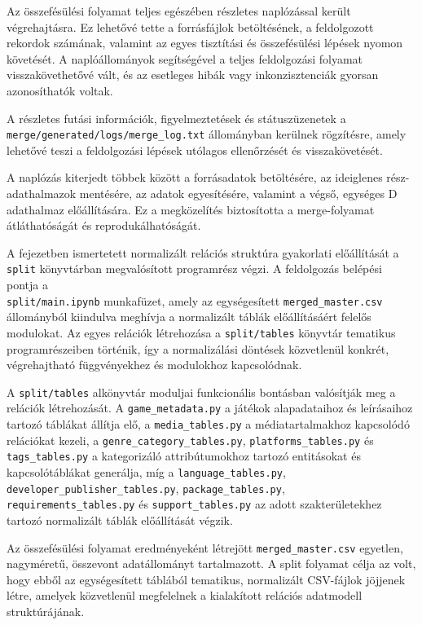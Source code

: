 Az összefésülési folyamat teljes egészében részletes naplózással került végrehajtásra. Ez lehetővé tette a forrásfájlok betöltésének, a feldolgozott rekordok számának, valamint az egyes tisztítási és összefésülési lépések nyomon követését. A naplóállományok segítségével a teljes feldolgozási folyamat visszakövethetővé vált, és az esetleges hibák vagy inkonzisztenciák gyorsan azonosíthatók voltak. 

A részletes futási információk, figyelmeztetések és státuszüzenetek a \\
\texttt{merge/generated/logs/merge\_log.txt} állományban kerülnek
rögzítésre, amely lehetővé teszi a feldolgozási lépések utólagos
ellenőrzését és visszakövetését.

A naplózás kiterjedt többek között a forrásadatok betöltésére, az ideiglenes rész-adathalmazok mentésére, az adatok egyesítésére, valamint a végső, egységes D adathalmaz előállítására. Ez a megközelítés biztosította a merge-folyamat átláthatóságát és reprodukálhatóságát.


A fejezetben ismertetett normalizált relációs struktúra gyakorlati
előállítását a \texttt{split} könyvtárban megvalósított programrész végzi.
A feldolgozás belépési pontja a \\
\texttt{split/main.ipynb} munkafüzet, amely az egységesített \texttt{merged\_master.csv} állományból kiindulva
meghívja a normalizált táblák előállításáért felelős modulokat. Az egyes
relációk létrehozása a \texttt{split/tables} könyvtár tematikus
programrészeiben történik, így a normalizálási döntések közvetlenül
konkrét, végrehajtható függvényekhez és modulokhoz kapcsolódnak.

A \texttt{split/tables} alkönyvtár moduljai funkcionális bontásban
valósítják meg a relációk létrehozását. A \texttt{game\_metadata.py} a
játékok alapadataihoz és leírásaihoz tartozó táblákat állítja elő, a
\texttt{media\_tables.py} a médiatartalmakhoz kapcsolódó relációkat kezeli,
a \texttt{genre\_category\_tables.py}, \texttt{platforms\_tables.py} és
\texttt{tags\_tables.py} a kategorizáló attribútumokhoz tartozó entitásokat
és kapcsolótáblákat generálja, míg a \texttt{language\_tables.py},
\texttt{developer\_publisher\_tables.py}, \texttt{package\_tables.py}, \\
\texttt{requirements\_tables.py} és \texttt{support\_tables.py} az adott
szakterületekhez tartozó normalizált táblák előállítását végzik.

Az összefésülési folyamat eredményeként létrejött \texttt{merged\_master.csv} egyetlen, \\ 
nagyméretű, összevont adatállományt tartalmazott. A split folyamat célja az volt, hogy ebből az egységesített táblából tematikus, normalizált CSV-fájlok jöjjenek létre, amelyek közvetlenül megfelelnek a kialakított relációs adatmodell struktúrájának.

